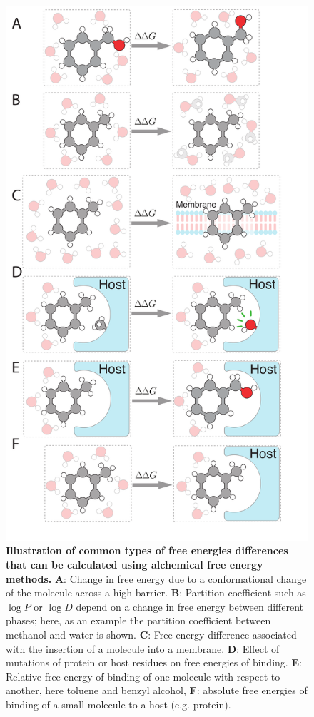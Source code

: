 \documentclass[9pt,bestpractices,pubversion]{livecoms}
\begin{document}
\begin{figure}
    \includegraphics[width=0.95\linewidth]{figures/fig1_what_is_alchemy/Figure.pdf}   
    \caption{\textbf{Illustration of common types of free energies differences that can be calculated using alchemical free energy methods.} \textbf{A}: Change in free energy due to a conformational change of the molecule across a high barrier. \textbf{B}: Partition coefficient such as $\log P$ or $\log D$ depend on a change in free energy between different phases; here, as an example the partition coefficient between methanol and water is shown. \textbf{C}: Free energy difference associated with the insertion of a molecule into a membrane. \textbf{D}: Effect of mutations of protein or host residues on free energies of binding. \textbf{E}: Relative free energy of binding of one molecule with respect to another, here toluene and benzyl alcohol, \textbf{F}: absolute free energies of binding of a small molecule to a host (e.g. protein).
    \label{fig:fig_what_is_alchemy}
    }
\end{figure}
\end{document}
